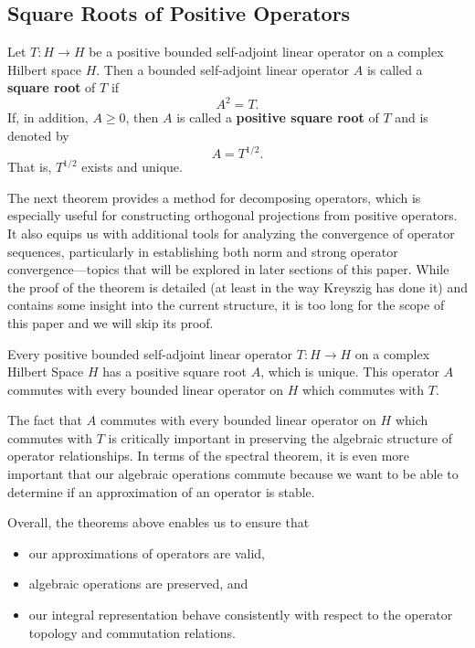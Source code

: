 \subsection{Square Roots of Positive Operators}

\begin{definition}
    Let \( T: H \to H  \) be a positive bounded self-adjoint linear operator on a complex Hilbert space \( H  \). Then a bounded self-adjoint linear operator \( A  \) is called a \textbf{square root} of \( T  \) if  
    \[  A^{2} = T.  \]
    If, in addition, \( A \geq 0  \), then \( A  \) is called a \textbf{positive square root} of \( T  \) and is denoted by
    \[  A = T^{1/2}. \]
    That is, \( T^{1/2}  \) exists and unique.
\end{definition}

The next theorem provides a method for decomposing operators, which is especially useful for constructing orthogonal projections from positive operators. It also equips us with additional tools for analyzing the convergence of operator sequences, particularly in establishing both norm and strong operator convergence—topics that will be explored in later sections of this paper. While the proof of the theorem is detailed (at least in the way Kreyszig has done it) and contains some insight into the current structure, it is too long for the scope of this paper and we will skip its proof. 

\begin{theorem}\label{9.4-2}
Every positive bounded self-adjoint linear operator \( T: H \to H  \) on a complex Hilbert Space \( H  \) has a positive square root \( A  \), which is unique. This operator \( A  \) commutes with every bounded linear operator on \( H  \) which commutes with \( T  \).    
\end{theorem}

The fact that \( A  \) commutes with every bounded linear operator on \( H  \) which commutes with \( T  \) is critically important in preserving the algebraic structure of operator relationships. In terms of the spectral theorem, it is even more important that our algebraic operations commute because we want to be able to determine if an approximation of an operator is stable.  

Overall, the theorems above enables us to ensure that
\begin{itemize}
    \item our approximations of operators are valid,
    \item algebraic operations are preserved, and
    \item our integral representation behave consistently with respect to the operator topology and commutation relations.
\end{itemize}



